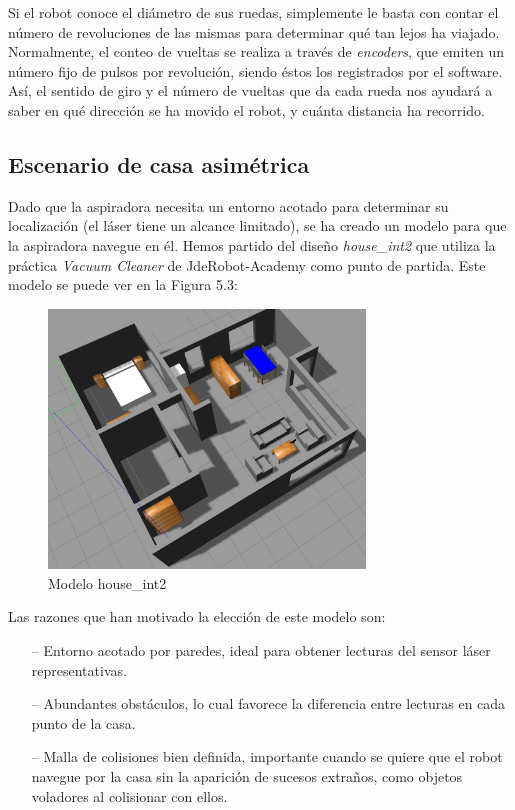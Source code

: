 Si el robot conoce el diámetro de sus ruedas, simplemente le basta con contar el número de revoluciones de las mismas para determinar qué tan lejos ha viajado. Normalmente, el conteo de vueltas se realiza a través de \textit{encoders}, que emiten un número fijo de pulsos por revolución, siendo éstos los registrados por el software. Así, el sentido de giro y el número de vueltas que da cada rueda nos ayudará a saber en qué dirección se ha movido el robot, y cuánta distancia ha recorrido.

\subsection{Escenario de casa asimétrica} 
Dado que la aspiradora necesita un entorno acotado para determinar su localización (el láser tiene un alcance limitado), se ha creado un modelo para que la aspiradora navegue en él.
Hemos partido del diseño \textit{house\_int2} que utiliza la práctica \textit{Vacuum Cleaner} de JdeRobot-Academy como punto de partida. Este modelo se puede ver en la Figura 5.3:

\begin{figure}[H]
  \begin{center}
    \includegraphics[width=0.75\textwidth]{figures/houseint.jpg}
		\caption{Modelo house\_int2}
		\label{fig.houseint}
		\end{center}
\end{figure}

Las razones que han motivado la elección de este modelo son:

\begin{itemize}
	\item[--] Entorno acotado por paredes, ideal para obtener lecturas del sensor láser representativas.
	\item[--]	Abundantes obstáculos, lo cual favorece la diferencia entre lecturas en cada punto de la casa.
	\item[--]	Malla de colisiones bien definida, importante cuando se quiere que el robot navegue por la casa sin la aparición de sucesos extraños, como objetos voladores al colisionar con ellos. 
\end{itemize}

